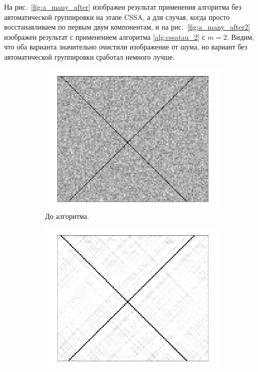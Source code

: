 \documentclass[specialist,
               substylefile = spbu.rtx,
               subf,href,colorlinks=true, 12pt]{disser}
\begin{document}
{{На рис.~\ref{fig:a_many_after} изображен результат применения алгоритма без автоматической группировки на этапе CSSA, а для случая, когда просто восстанавливаем по первым двум компонентам, и на рис.~\ref{fig:a_many_after2} изображен результат с применением алгоритма \ref{alg:cssatau_2} с $m=2$. Видим, что оба варианта значительно очистили изображение от шума, но вариант без автоматической группировки сработал немного лучше.
\begin{figure}[hhh!]
        \centering
    \begin{subfigure}[b]{0.32\textwidth}
        \includegraphics[width=\textwidth]{lines_noise}
        \caption{До алгоритма.}
        \label{fig:a_many_before}
    \end{subfigure}
        \quad
    \begin{subfigure}[b]{0.32\textwidth}
       \includegraphics[width=\textwidth]{noauto_lines}

\end{subfigure}
\end{figure}}}
\end{document}
